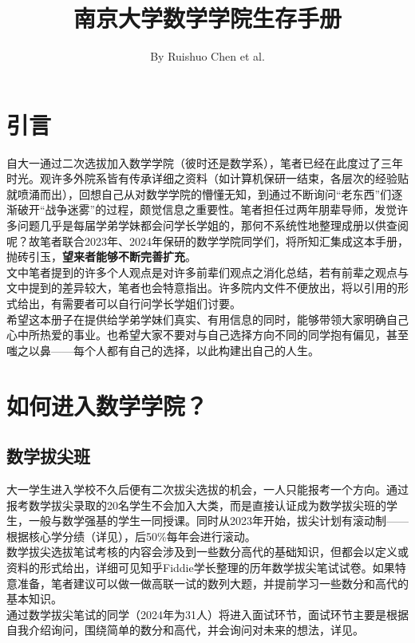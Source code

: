 \documentclass[a4paper,11pt,notitlepage]{article}
\title{\vspace{-1.5cm} \textbf{\huge{南京大学数学学院生存手册}}\vspace{-1em}}
\author{By Ruishuo Chen et al.}
\date{}
\newcommand{\empha}[1]{\textbf{#1}}
\begin{document}
\maketitle
\vspace{-1cm}
\thispagestyle{fancy}

\maketitle
\tableofcontents
\newpage

\section{引言}
自大一通过二次选拔加入数学学院（彼时还是数学系），笔者已经在此度过了三年时光。观许多外院系皆有传承详细之资料（如计算机保研一结束，各层次的经验贴就喷涌而出），回想自己从对数学学院的懵懂无知，到通过不断询问“老东西”们逐渐破开“战争迷雾”的过程，颇觉信息之重要性。笔者担任过两年朋辈导师，发觉许多问题几乎是每届学弟学妹都会问学长学姐的，那何不系统性地整理成册以供查阅呢？故笔者联合2023年、2024年保研的数学学院同学们，将所知汇集成这本手册，抛砖引玉，\empha{望来者能够不断完善扩充}。\\
\indent 文中笔者提到的许多个人观点是对许多前辈们观点之消化总结，若有前辈之观点与文中提到的差异较大，笔者也会特意指出。许多院内文件不便放出，将以引用的形式给出，有需要者可以自行问学长学姐们讨要。\\
\indent 希望这本册子在提供给学弟学妹们真实、有用信息的同时，能够带领大家明确自己心中所热爱的事业。也希望大家不要对与自己选择方向不同的同学抱有偏见，甚至嗤之以鼻——每个人都有自己的选择，以此构建出自己的人生。

\section{如何进入数学学院？}
\subsection{数学拔尖班}
大一学生进入学校不久后便有二次拔尖选拔的机会，一人只能报考一个方向。通过报考数学拔尖录取的20名学生不会加入大类，而是直接认证成为数学拔尖班的学生，一般与数学强基的学生一同授课。同时从2023年开始，拔尖计划有滚动制——根据核心学分绩（详见），后50\%每年会进行滚动。\\
\indent 数学拔尖选拔笔试考核的内容会涉及到一些数分高代的基础知识，但都会以定义或资料的形式给出，详细可见知乎Fiddie学长整理的历年数学拔尖笔试试卷。如果特意准备，笔者建议可以做一做高联一试的数列大题，并提前学习一些数分和高代的基本知识。\\
\indent 通过数学拔尖笔试的同学（2024年为31人）将进入面试环节，面试环节主要是根据自我介绍询问，围绕简单的数分和高代，并会询问对未来的想法，详见。
\end{document}
